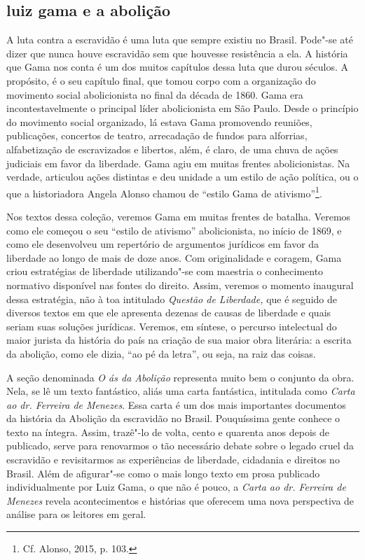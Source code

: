 \subsection{luiz gama e a abolição}

A luta contra a escravidão é uma luta que sempre existiu no Brasil.
Pode"-se até dizer que nunca houve escravidão sem que houvesse
resistência a ela. A história que Gama nos conta é um dos muitos
capítulos dessa luta que durou séculos. A propósito, é o seu capítulo
final, que tomou corpo com a organização do movimento social
abolicionista no final da década de 1860. Gama era incontestavelmente o
principal líder abolicionista em São Paulo. Desde o princípio do
movimento social organizado, lá estava Gama promovendo reuniões,
publicações, concertos de teatro, arrecadação de fundos para alforrias,
alfabetização de escravizados e libertos, além, é claro, de uma chuva de
ações judiciais em favor da liberdade. Gama agiu em muitas frentes
abolicionistas. Na verdade, articulou ações distintas e deu unidade a um
estilo de ação política, ou o que a historiadora Angela Alonso chamou de
``estilo Gama de ativismo''\footnote{Cf. Alonso, 2015, p. 103.}.

Nos textos dessa coleção, veremos Gama em muitas frentes de batalha.
Veremos como ele começou o seu ``estilo de ativismo'' abolicionista, no
início de 1869, e como ele desenvolveu um repertório de argumentos
jurídicos em favor da liberdade ao longo de mais de doze anos. Com
originalidade e coragem, Gama criou estratégias de liberdade
utilizando"-se com maestria o conhecimento normativo disponível nas
fontes do direito. Assim, veremos o momento inaugural dessa estratégia,
não à toa intitulado \emph{Questão de Liberdade,} que é seguido de
diversos textos em que ele apresenta dezenas de causas de liberdade e
quais seriam suas soluções jurídicas. Veremos, em síntese, o percurso
intelectual do maior jurista da história do país na criação de sua maior
obra literária: a escrita da abolição, como ele dizia, ``ao pé da letra'',
ou seja, na raiz das coisas.

A seção denominada \emph{O ás da Abolição} representa muito bem o
conjunto da obra. Nela, se lê um texto fantástico, aliás uma carta
fantástica, intitulada como \emph{Carta ao dr. Ferreira de Menezes}.
Essa carta é um dos mais importantes documentos da história da Abolição
da escravidão no Brasil. Pouquíssima gente conhece o texto na íntegra.
Assim, trazê"-lo de volta, cento e quarenta anos depois de publicado,
serve para renovarmos o tão necessário debate sobre o legado cruel da
escravidão e revisitarmos as experiências de liberdade, cidadania e
direitos no Brasil. Além de afigurar"-se como o mais longo texto em prosa
publicado individualmente por Luiz Gama, o que não é pouco, a
\emph{Carta ao dr. Ferreira de Menezes} revela acontecimentos e
histórias que oferecem uma nova perspectiva de análise para os leitores
em geral.

